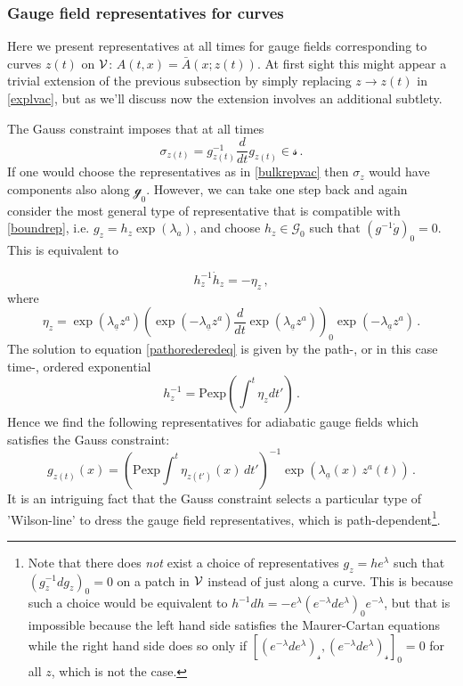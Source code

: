 \documentclass[11pt,a4paper]{article}
\def\l{{\lambda}}
\def\calg{{\mathscr G}}
\def\calsg{{\boldsymbol{\mathscr g}}}
\def\calss{{\boldsymbol{\mathscr s}}}
\def\calv{{\cal V}}
\def\ua{{\underline{a}}}
\begin{document}
     
  
  \subsubsection{Gauge field representatives for curves}\label{secadrep}
        Here we present representatives at all times for gauge fields corresponding to curves $z(t)$ on $\calv$: $A(t,x)=\bar A(x;z(t))$.  At first sight this might appear a trivial extension of the previous subsection by simply replacing $z\rightarrow z(t)$ in \eqref{explvac}, but as we'll discuss now the extension involves an additional subtlety.
        
             The Gauss constraint imposes that at all times
        \begin{equation}
        \sigma_{z(t)}=g^{-1}_{z(t)}\frac{d}{dt}g_{z(t)}\in\calss\,.
        \end{equation}
        If one would choose the representatives as in \eqref{bulkrepvac} then $\sigma_z$ would have components also along $\calsg_0$. However, we can take one step back and again consider the most general type of representative that is compatible with \eqref{boundrep}, i.e. $g_z=h_z\exp(\lambda_a)$, and choose $h_z\in \calg_0$ such that $(g^{-1}\dot g)_0=0$. This is equivalent to
      
       
        \begin{equation}
       h^{-1}_z\dot h_z=-\eta_z\,,\label{pathorederedeq}
        \end{equation}
        where
        \begin{equation}
        \eta_z=\exp(\lambda_\ua z^a)\left(\exp(-\lambda_\ua z^a)\frac{d}{dt} \exp(\lambda_\ua z^a)\right)_0\exp(-\lambda_\ua z^a)\,.\label{etaform}
        \end{equation}
        The solution to equation \eqref{pathorederedeq} is given by the path-, or in this case time-, ordered exponential 
        \begin{equation}
        h_z^{-1}=\mathrm{Pexp}\left(\int^t\eta_z dt'\right)\,.\label{hform}
        \end{equation}
        Hence we find the following representatives for adiabatic gauge fields which satisfies the Gauss constraint:
        \begin{equation}
        g_{z(t)}(x)=\left(\mathrm{Pexp}\int^t\eta_{z(t')}(x) \,dt'\right)^{-1}\exp(\lambda_\ua(x)\, z^a(t))\,.\label{timedeprep}
        \end{equation}
        It is an intriguing fact that the Gauss constraint selects a particular type of 'Wilson-line' to dress the gauge field representatives, which is path-dependent\footnote{Note that there does {\it not} exist a choice of representatives $g_z=h e^\lambda$ such that $(g_z^{-1}dg_z)_0=0$ on a patch in $\calv$ instead of just along a curve. This is because such a choice would be equivalent to $h^{-1}dh=-e^{\lambda}(e^{-\l}de^\l)_0e^{-\lambda}$, but that is impossible because the left hand side satisfies the Maurer-Cartan equations while the right hand side does so only if $[(e^{-\lambda}de^{\lambda})_\calss,(e^{-\lambda} d e^{\lambda})_\calss]_0=0$ for all $z$, which is not the case.}.
        
\end{document}
